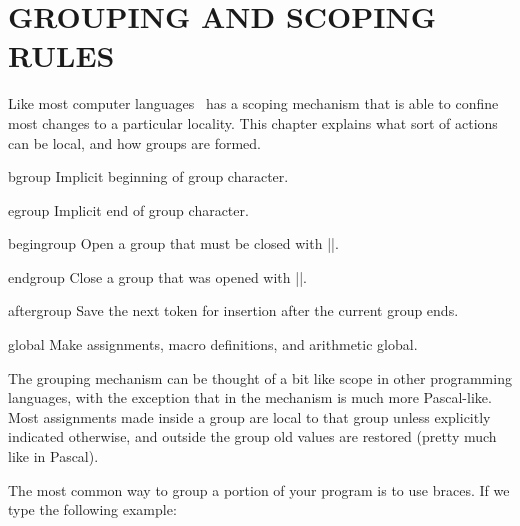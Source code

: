
\chapter{GROUPING AND SCOPING RULES}
\label{ch:grouping}

Like most computer languages \tex\ has a scoping mechanism that is able to confine most changes to a particular locality. This chapter explains what sort of actions can be local, and how groups are formed.
\medskip

\begin{docCommand}{bgroup}{}
Implicit beginning of group character.
\end{docCommand}

\begin{docCommand}{egroup}{}
 Implicit end of group character.
 \end{docCommand}

\begin{docCommand}{begingroup}{}
 Open a group that must be closed with |\endgroup|.
\end{docCommand}

\begin{docCommand}{endgroup}{} 
Close a group that was opened with |\begingroup|.
\end{docCommand}

\begin{docCommand}{aftergroup}{} 
Save the next token for insertion after the current group ends.
\end{docCommand}

\begin{docCommand}{global}{}
 Make assignments, macro definitions, and arithmetic global.
\end{docCommand} 




The grouping mechanism can be thought of a bit like scope in other programming languages, with the
exception that in \tex the mechanism is much more Pascal-like. Most assignments made inside a group are local to that group
unless explicitly indicated otherwise, and outside the group old values are restored (pretty much like in Pascal). 

The most common way to group a portion of your program is to use braces. If we type the following  example:

